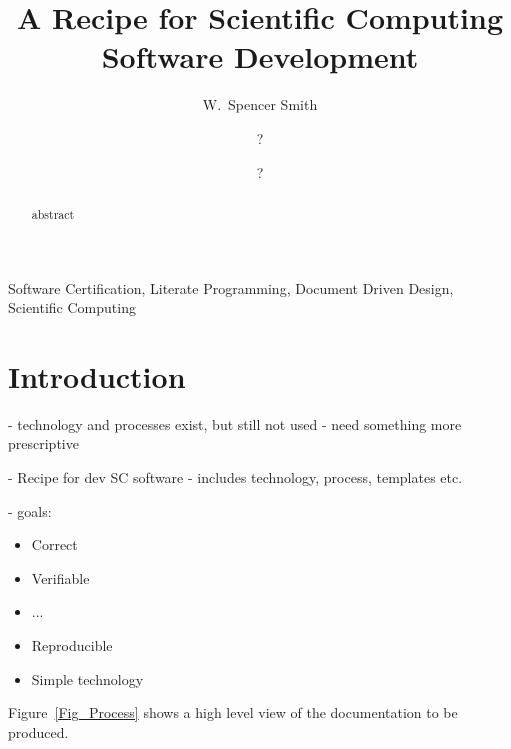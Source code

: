 \documentclass{elsarticle}
\begin{document}
\begin{frontmatter}

\title{A Recipe for Scientific Computing Software Development}

\author[mymainaddress]{W.\ Spencer Smith}

\author[mymainaddress]{?}

\author[mymainaddress]{?}

\address[mymainaddress]{Computing and Software Department, McMaster
University, Hamilton, Ontario L8S 4L7, Canada}

\begin{abstract}
abstract
\end{abstract}

\begin{keyword}
  Software Certification, Literate Programming, Document Driven Design,
  Scientific Computing
\end{keyword}

\end{frontmatter}


\section {Introduction} \label{Sec_Introduction}

- technology and processes exist, but still not used - need something more
prescriptive

- Recipe for dev SC software - includes technology, process, templates etc.

- goals:
\begin{itemize}
\item Correct
\item Verifiable
\item ...
\item Reproducible
\item Simple technology
\end{itemize}

Figure~\ref{Fig_Process} shows a high level view of the documentation to be produced.
\end{document}
